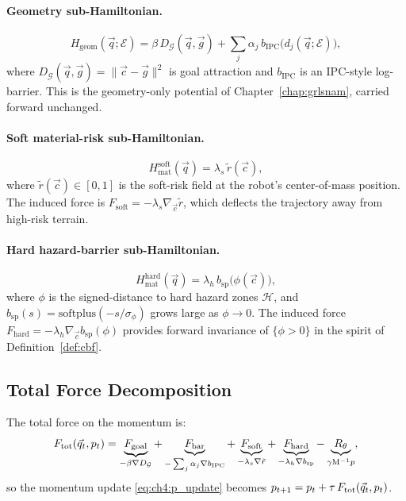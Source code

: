 \paragraph{Geometry sub-Hamiltonian.}
\begin{equation}
  H_{\mathrm{geom}}(\vec{q};\mathcal{E})
  = \beta\,D_{\mathcal{G}}(\vec{q},\vec{g})
    + \sum_{j}\alpha_j\,b_{\mathrm{IPC}}\!\bigl(d_j(\vec{q};\mathcal{E})\bigr),
  \label{eq:ch4:H_geom}
\end{equation}
where $D_{\mathcal{G}}(\vec{q},\vec{g}) = \|\vec{c}-\vec{g}\|^2$ is
goal attraction and $b_{\mathrm{IPC}}$ is an IPC-style log-barrier.
This is the geometry-only potential of Chapter~\ref{chap:grlsnam},
carried forward unchanged.

\paragraph{Soft material-risk sub-Hamiltonian.}
\begin{equation}
  H_{\mathrm{mat}}^{\mathrm{soft}}(\vec{q})
  = \lambda_s\,\tilde{r}(\vec{c}),
  \label{eq:ch4:H_mat_soft}
\end{equation}
where $\tilde{r}(\vec{c}) \in [0,1]$ is the soft-risk field at the
robot's center-of-mass position.
The induced force is $F_{\mathrm{soft}} = -\lambda_s\nabla_{\vec{c}}\tilde{r}$,
which deflects the trajectory away from high-risk terrain.

\paragraph{Hard hazard-barrier sub-Hamiltonian.}
\begin{equation}
  H_{\mathrm{mat}}^{\mathrm{hard}}(\vec{q})
  = \lambda_h\,b_{\mathrm{sp}}\!\bigl(\phi(\vec{c})\bigr),
  \label{eq:ch4:H_mat_hard}
\end{equation}
where $\phi$ is the signed-distance to hard hazard zones $\mathcal{H}$,
and $b_{\mathrm{sp}}(s) = \mathrm{softplus}(-s/\sigma_\phi)$ grows large
as $\phi \to 0$.
The induced force $F_{\mathrm{hard}} = -\lambda_h\nabla_{\vec{c}}b_{\mathrm{sp}}(\phi)$
provides forward invariance of $\{\phi > 0\}$ in the spirit of
Definition~\ref{def:cbf}.

\subsection{Total Force Decomposition}
\label{subsec:ch4:forces}

The total force on the momentum is:
\begin{equation}
  F_{\mathrm{tot}}(\vec{q}_t,p_t)
  = \underbrace{F_{\mathrm{goal}}}_{{-\beta\nabla D_\mathcal{G}}}
  + \underbrace{F_{\mathrm{bar}}}_{{-\sum_j\alpha_j\nabla b_{\mathrm{IPC}}}}
  + \underbrace{F_{\mathrm{soft}}}_{{-\lambda_s\nabla\tilde{r}}}
  + \underbrace{F_{\mathrm{hard}}}_{{-\lambda_h\nabla b_{\mathrm{sp}}}}
  - \underbrace{R_\theta}_{\gamma\mathrm{M}^{-1}p},
  \label{eq:ch4:F_tot}
\end{equation}
so the momentum update \eqref{eq:ch4:p_update} becomes
$p_{t+1} = p_t + \tau\,F_{\mathrm{tot}}(\vec{q}_t,p_t)$.

